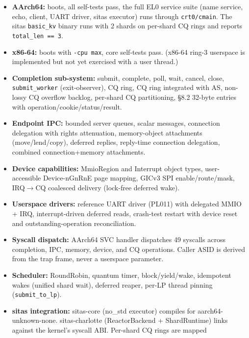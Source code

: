 \begin{itemize}
    \item \textbf{AArch64:} boots, all self-tests pass, the full EL0 service
        suite (name service, echo, client, UART driver, sitas executor) runs
        through \texttt{crt0/cmain}. The sitas \texttt{basic\_kv} binary runs
        with 2 shards on per-shard CQ rings and reports \texttt{total\_len == 3}.
    \item \textbf{x86-64:} boots with \texttt{-cpu max}, core self-tests pass.
        (x86-64 ring-3 userspace is implemented but not yet exercised with a
        user thread.)
    \item \textbf{Completion sub-system:} submit, complete, poll, wait, cancel,
        close, \texttt{submit\_worker} (exit-observer), CQ ring, CQ ring
        integrated with AS, non-lossy CQ overflow backlog, per-shard CQ
        partitioning, \S8.2 32-byte entries with operation/cookie/status/result.
    \item \textbf{Endpoint IPC:} bounded server queues, scalar messages,
        connection delegation with rights attenuation, memory-object attachments
        (move/lend/copy), deferred replies, reply-time connection delegation,
        combined connection+memory attachments.
    \item \textbf{Device capabilities:} MmioRegion and Interrupt object types,
        user-accessible Device-nGnRnE page mapping, GICv3 SPI enable/route/mask,
        IRQ$\rightarrow$CQ coalesced delivery (lock-free deferred wake).
    \item \textbf{Userspace drivers:} reference UART driver (PL011) with
        delegated MMIO + IRQ, interrupt-driven deferred reads, crash-test
        restart with device reset and outstanding-operation reconciliation.
    \item \textbf{Syscall dispatch:} AArch64 SVC handler dispatches 49 syscalls
        across completion, IPC, memory, device, and CQ operations. Caller ASID
        is derived from the trap frame, never a userspace parameter.
    \item \textbf{Scheduler:} RoundRobin, quantum timer, block/yield/wake,
        idempotent wakes (unified shard wait), deferred reaper, per-LP thread
        pinning (\texttt{submit\_to\_lp}).
    \item \textbf{sitas integration:} sitas-core (no\_std executor) compiles for
        aarch64-unknown-none. sitas-charlotte (ReactorBackend + ShardRuntime)
        links against the kernel's syscall ABI. Per-shard CQ rings are mapped

\end{itemize}
